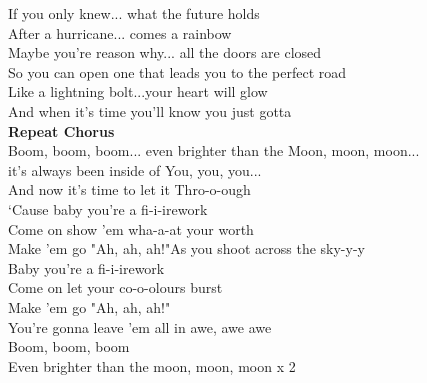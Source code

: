  If you only knew...  what the future holds\\
 After a hurricane...  comes a rainbow\\
 Maybe you're reason why...  all the doors are closed\\
 So you can open one that leads you to the perfect road\\
 Like a lightning bolt...your heart will glow\\
 And when it's time you'll know you just gotta\\
\textbf{Repeat Chorus}\\
Boom, boom, boom... even brighter than the Moon, moon, moon...\\
it's always been inside of You, you, you...\\
And now it's time to let it Thro-o-ough\\
‘Cause baby you're a fi-i-irework\\
Come on show 'em wha-a-at your worth\\
Make 'em go "Ah, ah, ah!"As you shoot across the sky-y-y\\
Baby you're a fi-i-irework\\
Come on let your co-o-olours burst\\
Make 'em go "Ah, ah, ah!"\\
You're gonna leave 'em all in awe, awe awe\\
Boom, boom, boom\\
Even brighter than the moon, moon, moon x 2


